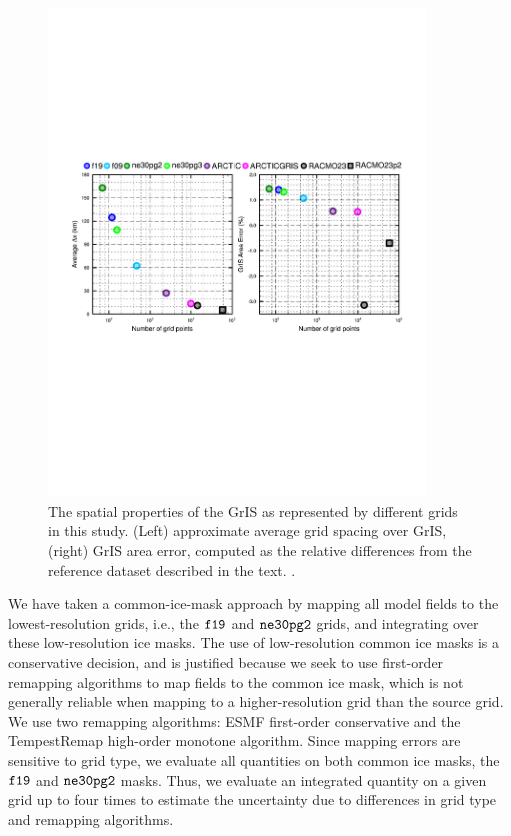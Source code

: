 \documentclass[draft]{agujournal2019}
\begin{document}
\begin{figure}[t]
\begin{center}
         \includegraphics[width=100mm]{temp_grisres.pdf}
\end{center}
\caption{The spatial properties of the GrIS as represented by different grids in this study. (Left) approximate average grid spacing over GrIS, (right) GrIS area error, computed as the relative differences from the reference dataset described in the text. {}.}
\label{fig:grisdx}
\end{figure}

We have taken a common-ice-mask approach by mapping all model fields to the lowest-resolution grids, i.e., the $\tt f19$ and $\tt ne30pg2$ grids, and integrating over these low-resolution ice masks. The use of low-resolution common ice masks is a conservative decision, and is justified because we seek to use first-order remapping algorithms to map fields to the common ice mask, which is not generally reliable when mapping to a higher-resolution grid than the source grid. We use two remapping algorithms: ESMF first-order conservative and the TempestRemap \cite{TempestRemap} high-order monotone algorithm. Since mapping errors are sensitive to grid type, we evaluate all quantities on both common ice masks, the $\tt f19$ and $\tt ne30pg2$ masks. Thus, we evaluate an integrated quantity on a given grid up to four times to estimate the uncertainty due to differences in grid type and remapping algorithms.
\end{document}
